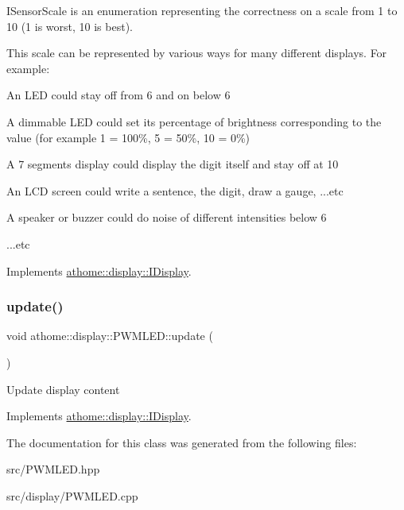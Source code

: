 I\+Sensor\+Scale is an enumeration representing the correctness on a scale from 1 to 10 (1 is worst, 10 is best).

This scale can be represented by various ways for many different displays. For example\+:


\begin{DoxyItemize}
\item An L\+ED could stay off from 6 and on below 6
\item A dimmable L\+ED could set it\textquotesingle{}s percentage of brightness corresponding to the value (for example 1 = 100\%, 5 = 50\%, 10 = 0\%)
\item A 7 segments display could display the digit itself and stay off at 10
\item An L\+CD screen could write a sentence, the digit, draw a gauge, ...etc
\item A speaker or buzzer could do noise of different intensities below 6
\item ...etc 
\end{DoxyItemize}

Implements \mbox{\hyperlink{classathome_1_1display_1_1_i_display_a3c9678f929e4bc04742d458b0c2399ef}{athome\+::display\+::\+I\+Display}}.

\mbox{\label{classathome_1_1display_1_1_p_w_m_l_e_d_a49a059d9bbd5bf08c0e057f0c957e736}} 
\subsubsection{\texorpdfstring{update()}{update()}}
{\footnotesize\ttfamily void athome\+::display\+::\+P\+W\+M\+L\+E\+D\+::update (\begin{DoxyParamCaption}{ }\end{DoxyParamCaption})\hspace{0.3cm}{\ttfamily [virtual]}}

Update display content 

Implements \mbox{\hyperlink{classathome_1_1display_1_1_i_display_a4ba7bd5d46f88578f1c846f4f5f3c5d1}{athome\+::display\+::\+I\+Display}}.



The documentation for this class was generated from the following files\+:\begin{DoxyCompactItemize}
\item 
src/P\+W\+M\+L\+E\+D.\+hpp\item 
src/display/P\+W\+M\+L\+E\+D.\+cpp\end{DoxyCompactItemize}
